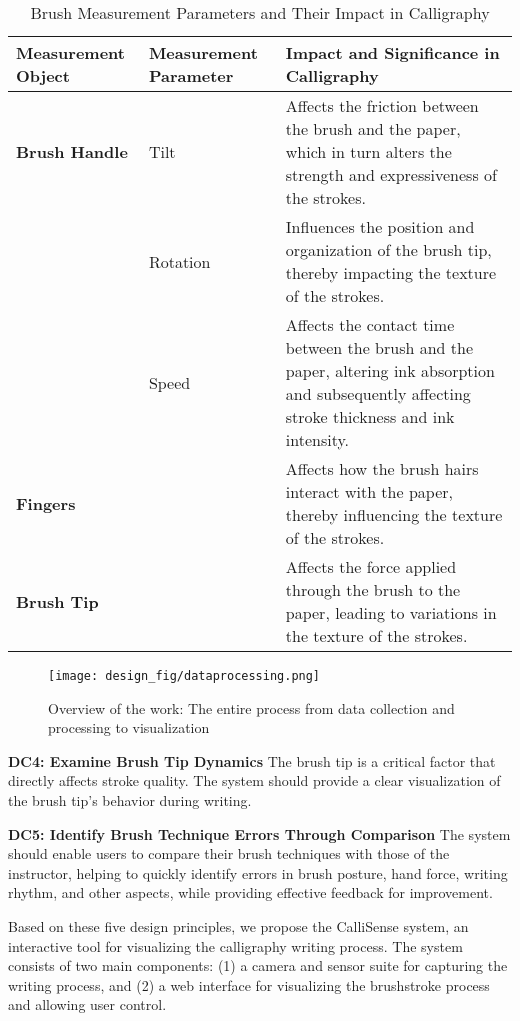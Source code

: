 \begin{table*}
\caption{Brush Measurement Parameters and Their Impact in Calligraphy}
\label{tab:calligraphy-measurements}
\setlength{\tabcolsep}{4pt}   %
\renewcommand{\arraystretch}{1.5}  %
\begin{tabular}{p{3cm} p{4cm} p{9cm}} %
\hline
\textbf{Measurement Object}   & \textbf{Measurement Parameter}  & \textbf{Impact and Significance in Calligraphy} \\ \hline
\textbf{Brush Handle}  
    & Tilt  
    & Affects the friction between the brush and the paper, which in turn alters the strength and expressiveness of the strokes. \\ \cline{2-3} 
    & Rotation  
    & Influences the position and organization of the brush tip, thereby impacting the texture of the strokes. \\ \cline{2-3} 
    & Speed  
    & Affects the contact time between the brush and the paper, altering ink absorption and subsequently affecting stroke thickness and ink intensity. \\ \hline
\textbf{Fingers}  
    &  
    & Affects how the brush hairs interact with the paper, thereby influencing the texture of the strokes. \\ \hline
\textbf{Brush Tip}  
    &  
    & Affects the force applied through the brush to the paper, leading to variations in the texture of the strokes. \\ \hline
\end{tabular}
\vspace{10pt}
\end{table*}

\begin{figure*}[t!]
  \centering
  \texttt{[image: design\_fig/dataprocessing.png]}
  \caption{Overview of the work: The entire process from data collection and processing to visualization}
  \label{fig:overview}
\end{figure*}

\textbf{DC4: Examine Brush Tip Dynamics}
The brush tip is a critical factor that directly affects stroke quality. The system should provide a clear visualization of the brush tip's behavior during writing.

\textbf{DC5: Identify Brush Technique Errors Through Comparison}
The system should enable users to compare their brush techniques with those of the instructor, helping to quickly identify errors in brush posture, hand force, writing rhythm, and other aspects, while providing effective feedback for improvement.

Based on these five design principles, we propose the CalliSense system, an interactive tool for visualizing the calligraphy writing process. The system consists of two main components: (1) a camera and sensor suite for capturing the writing process, and (2) a web interface for visualizing the brushstroke process and allowing user control.

